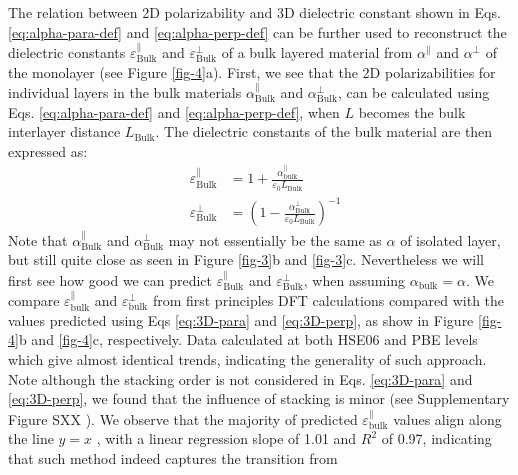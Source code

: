 \documentclass[journal=ancac3,manuscript=article,email=true,hyperref=true,keywords=false]{achemso}
\begin{document}
The relation between 2D polarizability and 3D dielectric constant
shown in Eqs. \ref{eq:alpha-para-def} and \ref{eq:alpha-perp-def} can
be further used to reconstruct the dielectric
constants $\varepsilon^{\parallel}_{\mathrm{Bulk}}$ and
$\varepsilon^{\perp}_{\mathrm{Bulk}}$ of a bulk layered material from
$\alpha^{\parallel}$ and $\alpha^{\perp}$ of the monolayer (see Figure
\ref{fig-4}a). First, we see that the 2D polarizabilities for
individual layers in the bulk materials
$\alpha_{\mathrm{Bulk}}^{\parallel}$ and
$\alpha_{\mathrm{Bulk}}^{\perp}$, can be calculated using
Eqs. \ref{eq:alpha-para-def} and \ref{eq:alpha-perp-def}, when $L$
becomes the bulk interlayer distance $L_{\mathrm{Bulk}}$. The
dielectric constants of the bulk material are then expressed as:
\begin{subequations}
\begin{eqnarray}
  \label{eq:3D-para}
  &\varepsilon^{\parallel}_{\mathrm{Bulk}} &= 1 + {\displaystyle \frac{\alpha_{\mathrm{bulk}}^{\parallel}}{\varepsilon_{0} L_{\mathrm{Bulk}}}}\\
  \label{eq:3D-perp}
  &\varepsilon^{\perp}_{\mathrm{Bulk}} &= \left(1 - \frac{\alpha_{\mathrm{Bulk}}^{\perp}}{\varepsilon_{0} L_{\mathrm{Bulk}}}\right)^{-1}
\end{eqnarray}
\end{subequations}
Note that $\alpha_{\mathrm{Bulk}}^{\parallel}$ and
$\alpha_{\mathrm{Bulk}}^{\perp}$ may not essentially be the same as
$\alpha$ of isolated layer, but still quite close as seen in Figure
\ref{fig-3}b and \ref{fig-3}c. Nevertheless we will first see how good
we can predict $\varepsilon_{\mathrm{Bulk}}^{\parallel}$ and
$\varepsilon_{\mathrm{Bulk}}^{\perp}$, when assuming
$\alpha_{\mathrm{bulk}}=\alpha$. We compare
$\varepsilon_{\mathrm{bulk}}^{\parallel}$ and
$\varepsilon_{\mathrm{bulk}}^{\perp}$ from first principles DFT
calculations compared with the values predicted using Eqs
\ref{eq:3D-para} and \ref{eq:3D-perp}, as show in Figure \ref{fig-4}b
and \ref{fig-4}c, respectively. Data calculated at both HSE06 and PBE
levels which give almost identical trends, indicating the generality
of such approach. Note although the stacking order is not considered
in Eqs. \ref{eq:3D-para} and \ref{eq:3D-perp}, we found that the
influence of stacking is minor (see Supplementary Figure SXX
). We observe that the majority of
predicted $\varepsilon_{\mathrm{bulk}}^{\parallel}$ values align along
the line $y=x$ , with a linear regression slope of 1.01 and $R^2$ of
0.97, indicating that such method indeed captures the transition from
\end{document}
